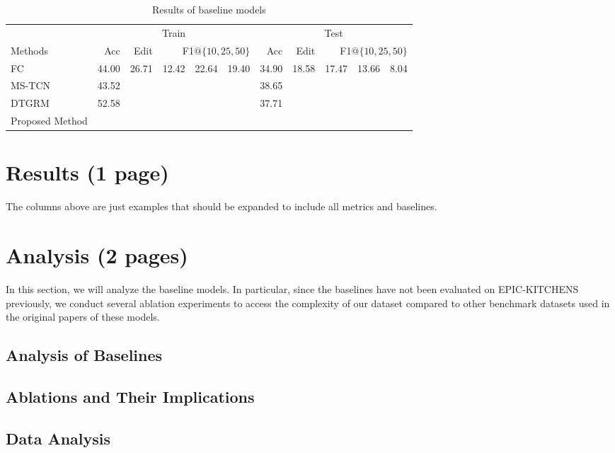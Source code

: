 \documentclass[11pt,a4paper]{article}
\begin{document}
\clearpage
\begin{table}[t]
\begin{center}
    \begin{minipage}[b]{1\textwidth}
\begin{tabular}{lrrrrrr}
\toprule
& \multicolumn{3}{c}{Train} & \multicolumn{3}{c}{Test}\\
Methods  & Acc & Edit & F1$@\{10,25,50\}$ & Acc & Edit & F1$@\{10,25,50\}$ \\
\midrule
FC  & 44.00 & 26.71 & 12.42~~22.64~~19.40 & 34.90 & 18.58 & 17.47~~13.66~~8.04\\
MS-TCN \cite{8953830} & 43.52 & & & 38.65 & & \\
DTGRM \cite{wang2020temporal} & 52.58 & & & 37.71 & & \\
\midrule
Proposed Method             & & & & \\
\bottomrule
\end{tabular}
\caption{Results of baseline models}
\label{table:results}
\end{minipage}
\end{center}
\end{table}
\section{Results (1 page)}
The columns above are just examples that should be expanded to include all metrics and baselines.

\clearpage
\section{Analysis (2 pages)}
In this section, we will analyze the baseline models. In particular, since the baselines have not been evaluated on EPIC-KITCHENS previously, we conduct several ablation experiments to access the complexity of our dataset compared to other benchmark datasets used in the original papers of these models.
\subsection{Analysis of Baselines}




\subsection{Ablations and Their Implications}










\clearpage

\begin{appendices}
\section{Data Analysis}
\label{appendix:A}


\end{appendices}
\end{document}
